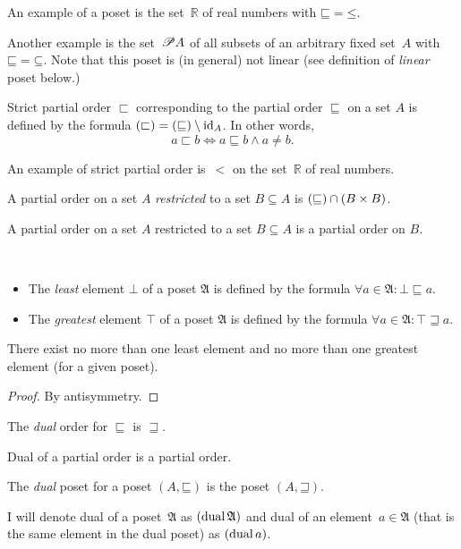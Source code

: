 An example of a poset is the set~$\mathbb{R}$ of real numbers with $\mathord{\sqsubseteq} = \mathord{\leq}$.

Another example is the set~$\mathscr{P} A$ of all subsets of an arbitrary fixed set~$A$ with $\mathord{\sqsubseteq} = \mathord{\subseteq}$.
Note that this poset is (in general) not linear (see definition of \emph{linear} poset below.)

\begin{defn}
Strict partial order $\sqsubset$ corresponding
to the partial order $\sqsubseteq$ on a set $A$ is defined by the
formula $\left(\mathord{\sqsubset}\right)=\left(\mathord{\sqsubseteq}\right)\setminus{\operatorname{id}}_{A}$.
In other words, \[ a\sqsubset b\Leftrightarrow a\sqsubseteq b\land a\ne b. \]
\end{defn}

An example of strict partial order is~$<$ on the set~$\mathbb{R}$ of real numbers.

\begin{defn}
A partial order on a set $A$ \emph{restricted}
to a set $B\subseteq A$ is $\left(\mathord{\sqsubseteq}\right)\cap(B\times B)$.\end{defn}
\begin{obvious}
A partial order on a set $A$ restricted to a set $B\subseteq A$
is a partial order on $B$.\end{obvious}
\begin{defn}
~
\begin{itemize}
\item {}The \emph{least} element $\bot$ of a poset
$\mathfrak{A}$ is defined by the formula $\forall a\in\mathfrak{A}:\bot\sqsubseteq a$.
\item {}The \emph{greatest} element $\top$ of a
poset $\mathfrak{A}$ is defined by the formula $\forall a\in\mathfrak{A}:\top\sqsupseteq a$.
\end{itemize}
\end{defn}
\begin{prop}
There exist no more than one least element and no more than one greatest
element (for a given poset).\end{prop}
\begin{proof}
By antisymmetry.\end{proof}
\begin{defn}
The \emph{dual} order for $\sqsubseteq$ is $\sqsupseteq$.\end{defn}
\begin{obvious}
Dual of a partial order is a partial order.\end{obvious}
\begin{defn}
The \emph{dual} poset for a poset $(A,\mathord{\sqsubseteq})$
is the poset $(A,\mathord{\sqsupseteq})$.
\end{defn}
I will denote dual of a poset~$\mathfrak{A}$ as $(\operatorname{dual}\mathfrak{A})$
and dual of an element~$a\in\mathfrak{A}$ (that is the same element
in the dual poset) as $(\operatorname{dual} a)$.

